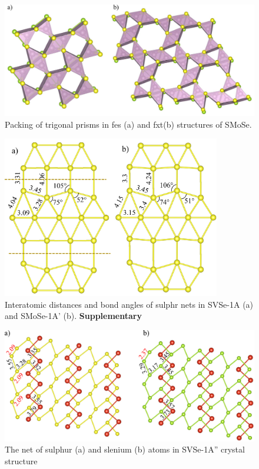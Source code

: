 \documentclass[a4paperm]{article}
\begin{document}
\begin{figure}[H]
	\includegraphics[width=\textwidth]{fes_fxt.png}
	\caption{Packing of trigonal prisms in fes (a) and fxt(b) structures of SMoSe.}
	\label{fes_fxt}
\end{figure}

\begin{figure}
	\includegraphics[width=0.85\textwidth]{airss1_s_comp.png}
	\caption{Interatomic distances and bond angles of sulphr nets in SVSe-1A (a) and SMoSe-1A' (b). \bf{Supplementary}}
	\label{airss1_s_comp}
\end{figure}

\begin{figure}[H]
	\includegraphics[width=\textwidth]{airss3_S_Se.png}
	\caption{The net of sulphur (a) and slenium (b) atoms in SVSe-1A'' crystal structure}
	\label{airss3_S_Se}
\end{figure}
\end{document}
